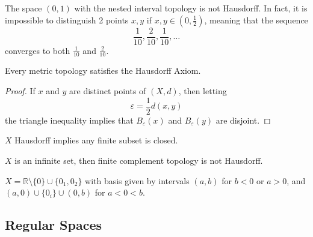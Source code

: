   \begin{example}
    The space $(0,1)$ with the nested interval topology is not Hausdorff. In fact, it is impossible to distinguish 2 points $x, y$ if $x, y \in (0, \frac{1}{2})$, meaning that the sequence
    \begin{equation}
        \frac{1}{10}, \frac{2}{10}, \frac{1}{10}, \ldots
    \end{equation}
    converges to both $\frac{1}{10}$ and $\frac{2}{10}$.
  \end{example} 

  \begin{theorem}
    Every metric topology satisfies the Hausdorff Axiom.
  \end{theorem}
  \begin{proof}
    If $x$ and $y$ are distinct points of $(X, d)$, then letting
    \begin{equation}
      \varepsilon = \frac{1}{2} d(x, y)
    \end{equation}
    the triangle inequality implies that $B_\varepsilon (x)$ and $B_\varepsilon (y)$ are disjoint. 
  \end{proof}

  \begin{lemma} 
    $X$ Hausdorff implies any finite subset is closed. 
  \end{lemma}

  \begin{example}
    $X$ is an infinite set, then finite complement topology is not Hausdorff. 
  \end{example} 

  \begin{example}
    $X = \mathbb{R} \setminus \{0\} \cup \{0_1, 0_2\}$ with basis given by intervals $(a, b)$ for $b < 0$ or $a > 0$, and $(a, 0) \cup \{0_i\} \cup (0, b)$ for $a < 0 < b$. 
  \end{example}

\subsection{Regular Spaces}

